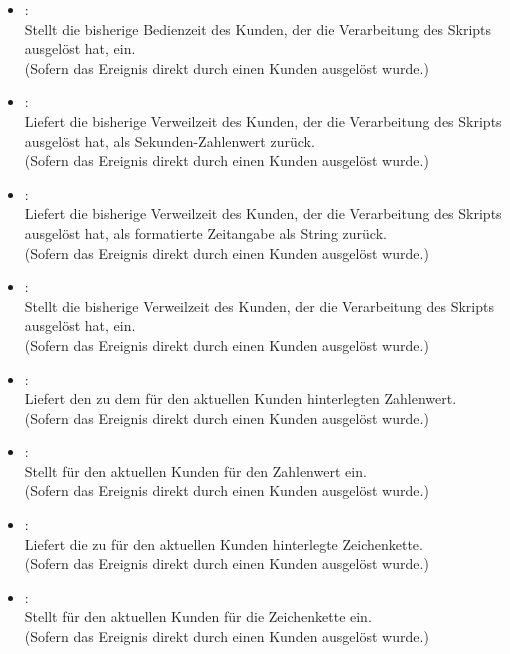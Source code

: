 \begin{itemize}
\item
{}:\\
Stellt die bisherige Bedienzeit des Kunden, der die Verarbeitung des Skripts ausgelöst hat, ein.\\
(Sofern das Ereignis direkt durch einen Kunden ausgelöst wurde.)

\item
{}:\\
Liefert die bisherige Verweilzeit des Kunden, der die Verarbeitung des Skripts ausgelöst hat, als Sekunden-Zahlenwert zurück.\\
(Sofern das Ereignis direkt durch einen Kunden ausgelöst wurde.)

\item
{}:\\
Liefert die bisherige Verweilzeit des Kunden, der die Verarbeitung des Skripts ausgelöst hat, als formatierte Zeitangabe als String zurück.\\
(Sofern das Ereignis direkt durch einen Kunden ausgelöst wurde.)

\item
{}:\\
Stellt die bisherige Verweilzeit des Kunden, der die Verarbeitung des Skripts ausgelöst hat, ein.\\
(Sofern das Ereignis direkt durch einen Kunden ausgelöst wurde.)

\item
{}:\\
Liefert den zu dem  für den aktuellen Kunden hinterlegten Zahlenwert.\\
(Sofern das Ereignis direkt durch einen Kunden ausgelöst wurde.)
  
\item
{}:\\
Stellt für den aktuellen Kunden für  den Zahlenwert  ein.\\
(Sofern das Ereignis direkt durch einen Kunden ausgelöst wurde.)

\item
{}:\\
Liefert die zu  für den aktuellen Kunden hinterlegte Zeichenkette.\\
(Sofern das Ereignis direkt durch einen Kunden ausgelöst wurde.)
  
\item
{}:\\
Stellt für den aktuellen Kunden für  die Zeichenkette  ein.\\
(Sofern das Ereignis direkt durch einen Kunden ausgelöst wurde.)

\end{itemize}

